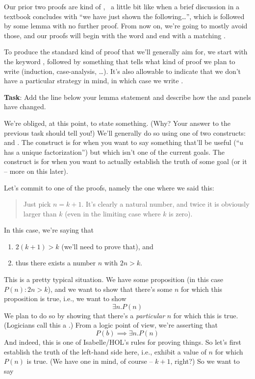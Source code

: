 Our prior two proofs are kind of ,  a little bit like when a brief discussion in a textbook concludes with ``we have just shown the following…'', which is followed by some lemma with no further proof. From now on, we're going to mostly avoid those, and our proofs will begin with the word  and end with a matching . 

To produce the standard kind of proof that we'll generally aim for, we start with the keyword , followed by something that tells what kind of proof we plan to write (induction, case-analysis, \ldots ). It's also allowable to indicate that we don't have a particular strategy in mind, in which case we write .

\textbf{Task}: Add the line  below your lemma statement and describe how the  and  panels have changed. 

We're obliged, at this point, to state something. (Why? Your answer to the previous task should tell you!) We'll generally do so using one of two constructs:  and . The  construct is for when you want to say something that'll be useful (``$u$ has a unique factorization'') but which isn't one of the current goals. The  construct is for when you want to actually establish the truth of some goal (or  it -- more on this later). 

Let's commit to one of the proofs, namely the one where we said this:
\begin{quotation}
Just pick $n = k + 1$. It's clearly a natural number, and twice it is obviously larger than $k$ (even in the limiting case where $k$ is zero). 
\end{quotation}
In this case, we're saying that 

\begin{enumerate}
    \item $2(k+1) > k$ (we'll need to prove that), and 
    \item thus there exists a number $n$ with $2n > k$. 
\end{enumerate}
This is a pretty typical situation. We have some proposition (in this case $P(n): 2n > k$), and we want to show that there's some $n$ for which this proposition is true, i.e., we want to show
$$
\exists n . P(n)
$$
We plan to do so by showing that there's a \textit{particular} $n$ for which this is true. (Logicians call this a .) From a logic point of view, we're asserting that
$$
P(b) \implies \exists n . P(n)
$$
And indeed, this is one of Isabelle/HOL's rules for proving things. So let's first establish the truth of the left-hand side here, i.e., exhibit a value of $n$ for which $P(n)$ is true. (We have one in mind, of course -- $k+1$, right?) So we want to say

